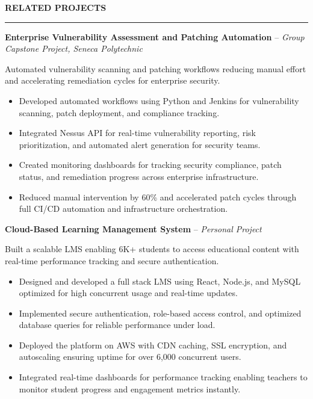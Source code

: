 \documentclass[10pt,letterpaper]{article}
\begin{document}
\vspace{6pt}

\textbf{RELATED PROJECTS}\\[-8pt]
\noindent\rule{\textwidth}{1pt}

\vspace{-2pt}

\textbf{Enterprise Vulnerability Assessment and Patching Automation} -- \emph{Group Capstone Project, Seneca Polytechnic }

\vspace{-1pt}

Automated vulnerability scanning and patching workflows reducing manual effort and accelerating remediation cycles for enterprise security.
\vspace{-1pt}
\begin{itemize}
\item Developed automated workflows using Python and Jenkins for vulnerability scanning, patch deployment, and compliance tracking.
\item Integrated Nessus API for real-time vulnerability reporting, risk prioritization, and automated alert generation for security teams.
\item Created monitoring dashboards for tracking security compliance, patch status, and remediation progress across enterprise infrastructure.
\item Reduced manual intervention by 60\% and accelerated patch cycles through full CI/CD automation and infrastructure orchestration.
\end{itemize}

\textbf{Cloud-Based Learning Management System} -- \emph{Personal Project}

\vspace{-1pt}

Built a scalable LMS enabling 6K+ students to access educational content with real-time performance tracking and secure authentication.
\vspace{-1pt}
\begin{itemize}
\item Designed and developed a full stack LMS using React, Node.js, and MySQL optimized for high concurrent usage and real-time updates.
\item Implemented secure authentication, role-based access control, and optimized database queries for reliable performance under load.
\item Deployed the platform on AWS with CDN caching, SSL encryption, and autoscaling ensuring uptime for over 6,000 concurrent users.
\item Integrated real-time dashboards for performance tracking enabling teachers to monitor student progress and engagement metrics instantly.
\end{itemize}
\end{document}
